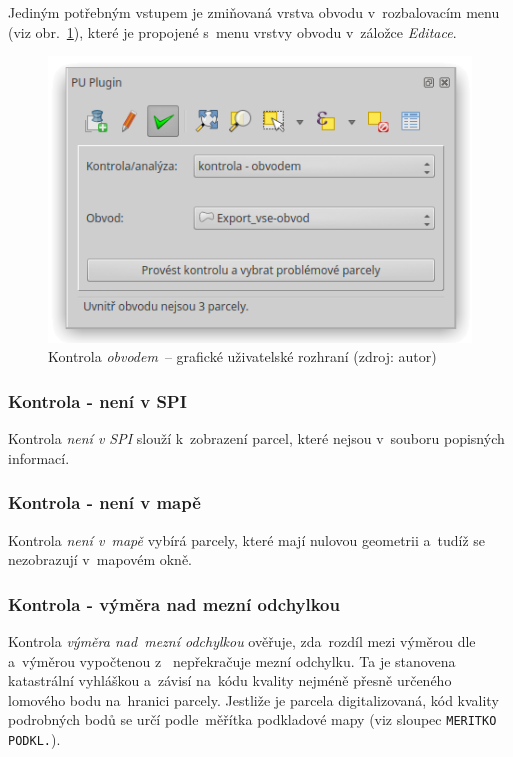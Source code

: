 Jediným potřebným vstupem je zmiňovaná vrstva obvodu v~rozbalovacím
menu (viz obr.~\ref{fig:manual_kontrola_obvodem_gui}), které je
propojené s~menu vrstvy obvodu v~záložce \textit{Editace}.

	\begin{figure}[H] \centering
		\includegraphics[width=.55\textwidth]{./pictures/kontrola-obvodem.png}
		\caption[Kontrola \textit{obvodem}~– grafické
uživatelské rozhraní]{Kontrola \textit{obvodem}~– grafické uživatelské
rozhraní (zdroj: autor)}
		\label{fig:manual_kontrola_obvodem_gui}
 	\end{figure}

\subsubsection{Kontrola - není v SPI}
\label{manual_kontrola_neni_v_spi}

Kontrola \textit{není v SPI} slouží k~zobrazení parcel, které nejsou
v~souboru popisných informací.

\subsubsection{Kontrola - není v mapě}
\label{manual_kontrola_neni_v_mape}

Kontrola \textit{není v~mapě} vybírá parcely, které mají nulovou
geometrii a~tudíž se nezobrazují v~mapovém okně.

\subsubsection{Kontrola - výměra nad mezní odchylkou}
\label{manual_kontrola_vymera}

Kontrola \textit{výměra nad~mezní odchylkou} ověřuje, zda~rozdíl mezi
výměrou dle~ a~výměrou vypočtenou z~ nepřekračuje
mezní odchylku. Ta je stanovena katastrální vyhláškou a~závisí na~kódu
kvality nejméně přesně určeného lomového bodu na~hranici
parcely. Jestliže je parcela digitalizovaná, kód kvality podrobných
bodů se určí podle~měřítka podkladové mapy (viz sloupec
\texttt{MERITKO PODKL.}).

